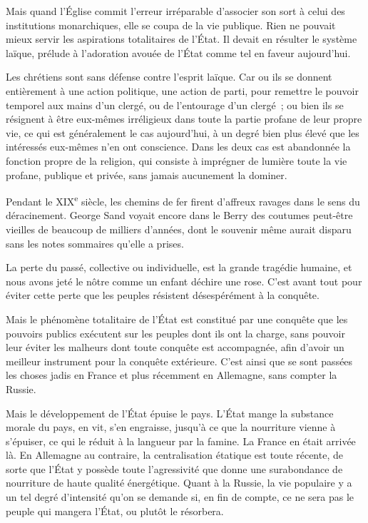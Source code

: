 \documentclass[french,twoside]{book} %
\begin{document}
Mais quand l'Église commit l'erreur irréparable d'associer son sort à celui des institutions monarchiques, elle se coupa de la vie publique. Rien ne pouvait mieux servir les aspirations totalitaires de l'État. Il devait en résulter le système laïque, prélude à l'adoration avouée de l'État comme tel en faveur aujourd'hui.\par
Les chrétiens sont sans défense contre l'esprit laïque. Car ou ils se donnent entièrement à une action politique, une action de parti, pour remettre le pouvoir temporel aux mains d'un clergé, ou de l'entourage d'un clergé ; ou bien ils se résignent à être eux-mêmes irréligieux dans toute la partie profane de leur propre vie, ce qui est généralement le cas aujourd'hui, à un degré bien plus élevé que les intéressés eux-mêmes n'en ont conscience. Dans les deux cas est abandonnée la fonction propre de la religion, qui consiste à imprégner de lumière toute la vie profane, publique et privée, sans jamais aucunement la dominer.\par
Pendant le XIX\textsuperscript{e} siècle, les chemins de fer firent d'affreux ravages dans le sens du déracinement. George Sand voyait encore dans le Berry des coutumes peut-être vieilles de beaucoup de milliers d'années, dont le souvenir même aurait disparu sans les notes sommaires qu'elle a prises.\par
La perte du passé, collective ou individuelle, est la grande tragédie humaine, et nous avons jeté le nôtre comme un enfant déchire une rose. C'est avant tout pour éviter cette perte que les peuples résistent désespérément à la conquête.\par
Mais le phénomène totalitaire de l'État est constitué par une conquête que les pouvoirs publics exécutent sur les peuples dont ils ont la charge, sans pouvoir leur éviter les malheurs dont toute conquête est accompagnée, afin d'avoir un meilleur instrument pour la conquête extérieure. C’est ainsi que se sont passées les choses jadis en France et plus récemment en Allemagne, sans compter la Russie.\par
Mais le développement de l'État épuise le pays. L'État mange la substance morale du pays, en vit, s'en engraisse, jusqu'à ce que la nourriture vienne à s'épuiser, ce qui le réduit à la langueur par la famine. La France en était arrivée là. En Allemagne au contraire, la centralisation étatique est toute récente, de sorte que l'État y possède toute l'agressivité que donne une surabondance de nourriture de haute qualité énergétique. Quant à la Russie, la vie populaire y a un tel degré d'intensité qu'on se demande si, en fin de compte, ce ne sera pas le peuple qui mangera l'État, ou plutôt le résorbera.\par
\end{document}
